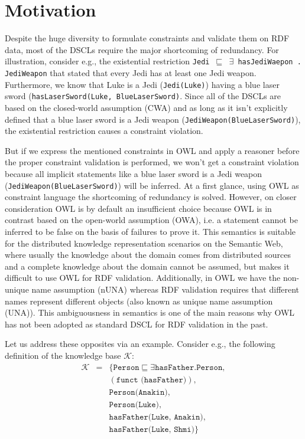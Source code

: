 \documentclass{llncs}
\newcommand{\ms}[1]{\texttt{#1}}
\begin{document}
\section{Motivation}
Despite the huge diversity to formulate constraints and validate them on RDF data, most of the DSCLs require the major shortcoming of redundancy. For illustration, consider e.g., the existential restriction \ms{Jedi $\sqsubseteq$ $\exists$ hasJediWaepon . JediWeapon} that stated that every Jedi has at least one Jedi weapon. Furthermore, we know that Luke is a Jedi (\ms{Jedi(Luke)}) having a blue laser sword (\ms{hasLaserSword(Luke, BlueLaserSword)}. Since all of the DSCLs are based on the closed-world assumption (CWA) and as long as it isn't explicitly defined that a blue laser sword is a Jedi weapon (\ms{JediWeapon(BlueLaserSword)}), the existential restriction causes a constraint violation.

But if we express the mentioned constraints in OWL and apply a reasoner before the proper constraint validation is performed, we won't get a constraint violation because all implicit statements like a blue laser sword is a Jedi weapon (\ms{JediWeapon(BlueLaserSword)}) will be inferred. At a first glance, using OWL as constraint language the shortcoming of redundancy is solved. However, on closer consideration OWL is by default an insufficient choice because OWL is in contrast based on the open-world assumption (OWA), i.e. a statement cannot be inferred to be false on the basis of failures to prove it. 
This semantics is suitable for the distributed knowledge representation scenarios on the Semantic Web, 
where usually the knowledge about the domain comes from distributed
sources and a complete knowledge about the domain cannot be assumed, 
but makes it difficult to use OWL for RDF validation.
Additionally, in OWL we have the non-unique name assumption (nUNA) whereas RDF validation requires that different names represent different objects (also known as unique name assumption (UNA)).
This ambiguousness in semantics is one of the main reasons why OWL has not been adopted as standard DSCL for RDF validation in the past. 

Let us address these opposites via an example. Consider e.g., the following definition of the knowledge base $\mathcal{K}$:
\begin{eqnarray*}
\mathcal{K} &=  & \{\ms{Person} \sqsubseteq \exists \ms{hasFather.Person}, \\
 &&(\ms{funct (hasFather)}),\\
 && \ms{Person(Anakin)},\\
 && \ms{Person(Luke)},\\
 && \ms{hasFather(Luke, Anakin)},\\ 
 && \ms{hasFather(Luke, Shmi)}\}
\end{eqnarray*}
\end{document}
